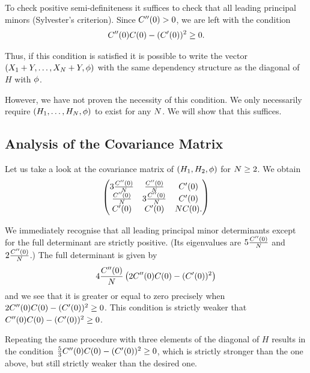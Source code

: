 To check positive semi-definiteness it suffices to check that all leading principal minors (Sylvester's criterion). Since $C''(0)>0$, we are left with the condition 
\begin{align*}
    C''(0) C(0) - (C'(0))^2 \geq 0.
\end{align*}

Thus, if this condition is satisfied it is possible to write the vector $(X_1 + Y, \ldots, X_N + Y,\phi)$ with the same dependency structure as the diagonal of $H$ with $\phi$.

However, we have not proven the necessity of this condition. We only necessarily require $(H_1, \ldots, H_N,\phi)$ to exist for any $N$. We will show that this suffices.

\subsection{Analysis of the Covariance Matrix}

Let us take a look at the covariance matrix of $(H_1, H_2, \phi)$ for $N \geq 2$. We obtain
\begin{align*}
    \begin{pmatrix*}
        3 \frac{\sqC''(0)}{\dimension} & \frac{\sqC''(0)}{\dimension}   & \sqC'(0) \\
        \frac{\sqC''(0)}{\dimension}& 3 \frac{\sqC''(0)}{\dimension}    & \sqC'(0) \\
        \sqC'(0) & \sqC'(0) & N \sqC(0).
    \end{pmatrix*}
\end{align*}

We immediately recognise that all leading principal minor determinants except for the full determinant are strictly positive. (Its eigenvalues are $5\frac{C''(0)}{N}$ and $2\frac{C''(0)}{N}$.) The full determinant is given by 
\begin{align*}
    4 \frac{C''(0)}{N} \left(2C''(0)C(0) - (C'(0))^2\right)
\end{align*}
and we see that it is greater or equal to zero precisely when $2C''(0)C(0) - (C'(0))^2 \geq 0$. This condition is strictly weaker that $C''(0)C(0) - (C'(0))^2 \geq 0$.

Repeating the same procedure with three elements of the diagonal of $H$ results in the condition $\frac{5}{3} C''(0)C(0) - (C'(0))^2 \geq 0$, which is strictly stronger than the one above, but still strictly weaker than the desired one.

